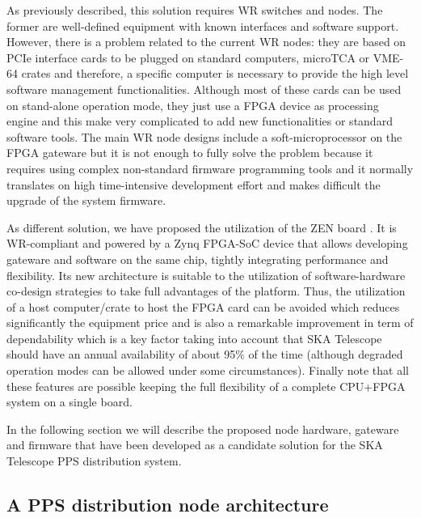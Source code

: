 As previously described, this solution requires WR switches and nodes. The 
former are well-defined equipment with known interfaces and software support. 
However, there is a problem related to the current WR nodes: they are based on 
PCIe interface cards to be plugged on standard computers, microTCA or VME-64 
crates and therefore, a specific computer is necessary to provide the high 
level software management functionalities. Although most of these cards can be used on 
stand-alone operation mode, they just use a FPGA device as processing engine 
and this make very complicated to add new functionalities or standard software 
tools. The main WR node designs include a soft-microprocessor on the FPGA gateware but it is not 
enough to fully solve the problem because it requires using complex 
non-standard firmware programming tools and it normally translates on high 
time-intensive development effort and makes difficult the upgrade of the system 
firmware.

As different solution, we have proposed the utilization of the ZEN board 
\cite{sevensols:wr_zen}. It is WR-compliant and powered by a Zynq FPGA-SoC device \cite{xilinx:zynq} that allows developing 
gateware and software on the same chip, tightly integrating performance and 
flexibility. Its new architecture is suitable to the utilization of 
software-hardware co-design strategies to take full advantages of the platform. 
Thus, the utilization of a host computer/crate to host the FPGA card can be avoided which reduces significantly the equipment price and is also a remarkable improvement in term of dependability which is a key factor taking into account that SKA Telescope should have an annual availability of about 95\% of the time (although degraded operation modes can be allowed under some circumstances).
Finally note that all these features are possible keeping the full flexibility of a complete CPU+FPGA system on a single board. 

In the following section we will describe the proposed node hardware, gateware and firmware that have been developed as a candidate solution for the SKA Telescope PPS distribution system. 

\subsection{A PPS distribution node architecture}

